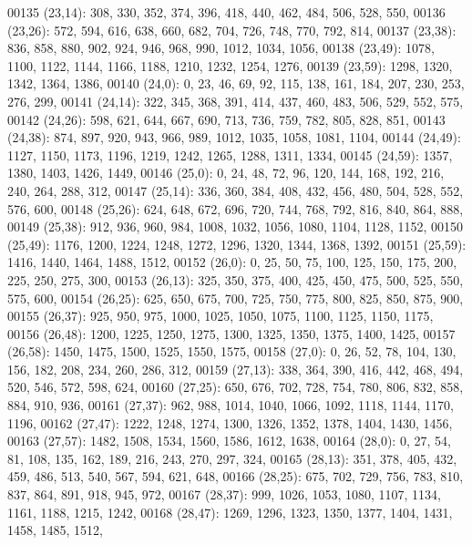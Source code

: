 \begin{DoxyCode}
00135       (23,14): 308, 330, 352, 374, 396, 418, 440, 462, 484, 506, 528, 550,
00136       (23,26): 572, 594, 616, 638, 660, 682, 704, 726, 748, 770, 792, 814,
00137       (23,38): 836, 858, 880, 902, 924, 946, 968, 990, 1012, 1034, 1056,
00138       (23,49): 1078, 1100, 1122, 1144, 1166, 1188, 1210, 1232, 1254, 1276,
00139       (23,59): 1298, 1320, 1342, 1364, 1386,
00140       (24,0): 0, 23, 46, 69, 92, 115, 138, 161, 184, 207, 230, 253, 276, 299,
00141       (24,14): 322, 345, 368, 391, 414, 437, 460, 483, 506, 529, 552, 575,
00142       (24,26): 598, 621, 644, 667, 690, 713, 736, 759, 782, 805, 828, 851,
00143       (24,38): 874, 897, 920, 943, 966, 989, 1012, 1035, 1058, 1081, 1104,
00144       (24,49): 1127, 1150, 1173, 1196, 1219, 1242, 1265, 1288, 1311, 1334,
00145       (24,59): 1357, 1380, 1403, 1426, 1449,
00146       (25,0): 0, 24, 48, 72, 96, 120, 144, 168, 192, 216, 240, 264, 288, 312,
00147       (25,14): 336, 360, 384, 408, 432, 456, 480, 504, 528, 552, 576, 600,
00148       (25,26): 624, 648, 672, 696, 720, 744, 768, 792, 816, 840, 864, 888,
00149       (25,38): 912, 936, 960, 984, 1008, 1032, 1056, 1080, 1104, 1128, 1152,
00150       (25,49): 1176, 1200, 1224, 1248, 1272, 1296, 1320, 1344, 1368, 1392,
00151       (25,59): 1416, 1440, 1464, 1488, 1512,
00152       (26,0): 0, 25, 50, 75, 100, 125, 150, 175, 200, 225, 250, 275, 300,
00153       (26,13): 325, 350, 375, 400, 425, 450, 475, 500, 525, 550, 575, 600,
00154       (26,25): 625, 650, 675, 700, 725, 750, 775, 800, 825, 850, 875, 900,
00155       (26,37): 925, 950, 975, 1000, 1025, 1050, 1075, 1100, 1125, 1150, 1175,
00156       (26,48): 1200, 1225, 1250, 1275, 1300, 1325, 1350, 1375, 1400, 1425,
00157       (26,58): 1450, 1475, 1500, 1525, 1550, 1575,
00158       (27,0): 0, 26, 52, 78, 104, 130, 156, 182, 208, 234, 260, 286, 312,
00159       (27,13): 338, 364, 390, 416, 442, 468, 494, 520, 546, 572, 598, 624,
00160       (27,25): 650, 676, 702, 728, 754, 780, 806, 832, 858, 884, 910, 936,
00161       (27,37): 962, 988, 1014, 1040, 1066, 1092, 1118, 1144, 1170, 1196,
00162       (27,47): 1222, 1248, 1274, 1300, 1326, 1352, 1378, 1404, 1430, 1456,
00163       (27,57): 1482, 1508, 1534, 1560, 1586, 1612, 1638,
00164       (28,0): 0, 27, 54, 81, 108, 135, 162, 189, 216, 243, 270, 297, 324,
00165       (28,13): 351, 378, 405, 432, 459, 486, 513, 540, 567, 594, 621, 648,
00166       (28,25): 675, 702, 729, 756, 783, 810, 837, 864, 891, 918, 945, 972,
00167       (28,37): 999, 1026, 1053, 1080, 1107, 1134, 1161, 1188, 1215, 1242,
00168       (28,47): 1269, 1296, 1323, 1350, 1377, 1404, 1431, 1458, 1485, 1512,

\end{DoxyCode}
